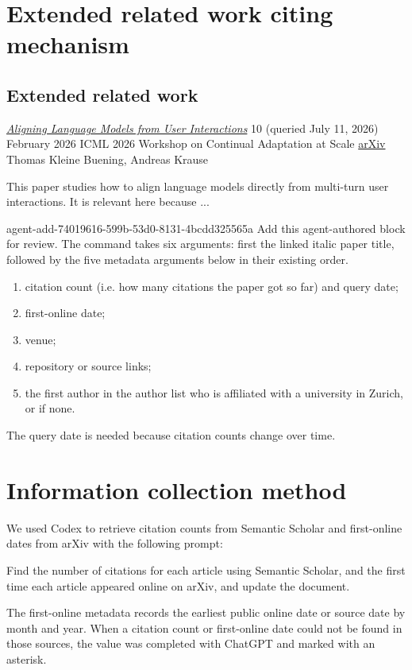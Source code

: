 \section*{Extended related work citing mechanism}
\begin{DocCode}
\section*{Extended related work}


\relatedWorkMeta
  {\href{https://arxiv.org/pdf/2603.12273}
    {\emph{Aligning Language Models from User Interactions}}
  \citep{kleinebuening2026aligning}}
  {10 (queried July 11, 2026)}
  {February 2026}
  {ICML 2026 Workshop on Continual Adaptation at Scale}
  {\href{https://arxiv.org/abs/2603.12273}{arXiv}}
  {Thomas Kleine Buening, Andreas Krause}

This paper studies how to align language models directly from multi-turn user interactions. 
It is relevant here because ...
\end{DocCode}

\agentProposedEdit
  {agent-add-74019616-599b-53d0-8131-4bcdd325565a}
  {Add this agent-authored block for review.}
  {}
  {The command takes six arguments: first the linked italic paper title, followed by the five metadata arguments below in their existing order.}

\begin{enumerate}
  \item citation count (i.e. how many citations the paper got so far) and query date;
  \item first-online date;
  \item venue;
  \item repository or source links;
  \item the first author in the author list who is affiliated with a university in Zurich, or \code{-} if none.
\end{enumerate}

The query date is needed because citation counts change over time.

\section*{Information collection method}
\label{app:related-work-information-method}
We used Codex to retrieve citation counts from Semantic Scholar and first-online dates from arXiv with the following prompt:
\begin{DocCode}
  Find the number of citations for each article using Semantic Scholar, and the first time each article appeared online on arXiv, and update the document.
\end{DocCode}
The first-online metadata records the earliest public online date or source date by month and year.
When a citation count or first-online date could not be found in those sources, the value was completed with ChatGPT and marked with an asterisk.

